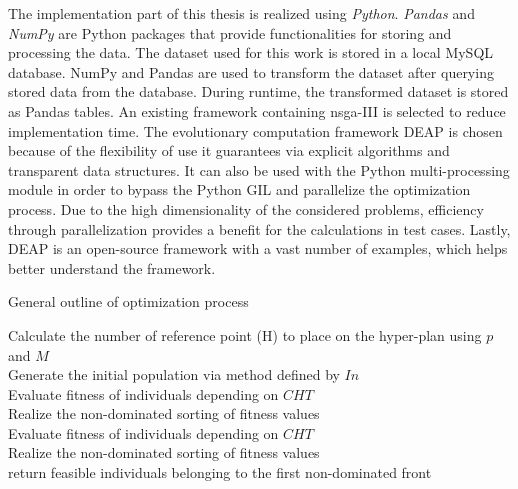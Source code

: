 The implementation part of this thesis is realized using \textit{Python}. \textit{Pandas}  \parencite{McKinney2010DataPython} and \textit{NumPy} \parencite{Harris2020ArrayNumPy} are Python packages that provide functionalities for storing and processing the data. The dataset used for this work is stored in a local MySQL database. NumPy and Pandas are used to transform the dataset after querying stored data from the database. During runtime, the transformed dataset is stored as Pandas tables. An existing framework containing \gls{nsga}-III is selected to reduce implementation time. The evolutionary computation framework  \gls{DEAP} \parencite{Fortin2012DEAP:Easy} is chosen because of the flexibility of use it guarantees via explicit algorithms and transparent data structures. It can also be used with the Python multi-processing module in order to bypass the Python GIL and parallelize the optimization process. Due to the high dimensionality of the considered problems, efficiency through parallelization provides a benefit for the calculations in test cases. Lastly, \gls{DEAP} is an open-source framework with a vast number of examples, which helps better understand the framework.

\begin{algorithm}
  \caption{General outline of optimization process}\label{alg:opt_framework}
  Calculate the number of reference point (H) to place on the hyper-plan using $p$ and $M$\\
  Generate the initial population via method defined by $In$\\
  Evaluate fitness of individuals depending on $CHT$\\
  Realize the non-dominated sorting of fitness values\\
    Evaluate fitness of individuals depending on $CHT$\\
    Realize the non-dominated sorting of fitness values\\
    return feasible individuals belonging to the first non-dominated front
  \end{algorithm}

